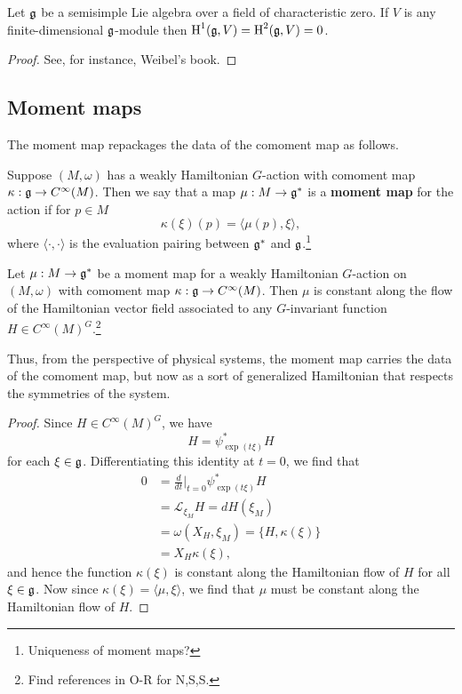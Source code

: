 \documentclass{amsart}
\begin{document}
\begin{theorem}
    Let $\mathfrak g$ be a semisimple Lie algebra over a field of characteristic zero. If $V$
    is any finite-dimensional $\mathfrak g$-module then $\operatorname{H}^1(\mathfrak g,V) = \operatorname{H}^2(\mathfrak g,V)=0$.
\end{theorem}
\begin{proof}
    See, for instance, Weibel's book.
\end{proof}

\subsection{Moment maps}

The moment map repackages the data of the comoment map as follows.
\begin{definition}
    Suppose $(M,\omega)$ has a weakly Hamiltonian $G$-action with comoment map $\kappa:\mathfrak g\to C^\infty(M)$.
    Then we say that a map $\mu:M\to \mathfrak g^*$ is a \textbf{moment map} for the action if for $p\in M$
    \begin{equation*}
        \kappa(\xi)(p) = \langle \mu(p), \xi\rangle,
    \end{equation*}
    where $\langle\cdot,\cdot\rangle$ is the evaluation pairing between $\mathfrak g^*$ and $\mathfrak g$.\footnote{Uniqueness of moment maps?}
\end{definition}

\begin{theorem}
    Let $\mu:M\to\mathfrak g^*$ be a moment map for a weakly Hamiltonian $G$-action on $(M,\omega)$
    with comoment map $\kappa:\mathfrak g\to C^\infty(M)$.
    Then $\mu$ is constant along the flow of the Hamiltonian vector field associated to any
    $G$-invariant function $H\in C^\infty(M)^G$.\footnote{Find references in O-R for N,S,S.}
\end{theorem}

Thus, from the perspective of physical systems, the moment map carries the data of
the comoment map, but now as a sort of generalized Hamiltonian that respects the symmetries
of the system.

\begin{proof}
    Since $H\in C^\infty(M)^G$, we have
    \begin{equation*}
        H=\psi_{\exp(t\xi)}^*H
    \end{equation*}
    for each $\xi\in\mathfrak g$. Differentiating this identity at $t=0$, we find that
    \begin{align*}
        0 &= \frac{d}{dt}\bigg|_{t=0} \psi_{\exp(t\xi)}^*H\\
        &= \mathcal{L}_{\xi_M}H=dH(\xi_M)\\
        &= \omega(X_H,\xi_M)=\{H,\kappa(\xi)\}\\
        &= X_H\kappa(\xi),
    \end{align*}
    and hence the function $\kappa(\xi)$ is constant along the Hamiltonian flow of $H$ for all
    $\xi\in\mathfrak g$.  Now since $\kappa(\xi) = \langle \mu, \xi\rangle$, we find that $\mu$ must be
    constant along the Hamiltonian flow of $H$.
\end{proof}
\end{document}
